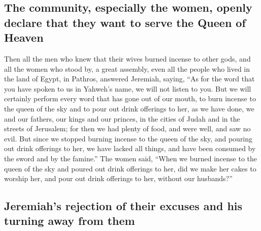 \begin{paracol}{2}
\begin{otherlanguage}{english}
\hypertarget{the-community-especially-the-women-openly-declare-that-they-want-to-serve-the-queen-of-heaven}{%
\subsection{The community, especially the women, openly declare that
they want to serve the Queen of
Heaven}\label{the-community-especially-the-women-openly-declare-that-they-want-to-serve-the-queen-of-heaven}}

 Then all the men who knew that their wives burned
incense to other gods, and all the women who stood by, a great assembly,
even all the people who lived in the land of Egypt, in Pathros, answered
Jeremiah, saying,  ``As for the word that you have spoken
to us in Yahweh's name, we will not listen to you.  But
we will certainly perform every word that has gone out of our mouth, to
burn incense to the queen of the sky and to pour out drink offerings to
her, as we have done, we and our fathers, our kings and our princes, in
the cities of Judah and in the streets of Jerusalem; for then we had
plenty of food, and were well, and saw no evil.  But
since we stopped burning incense to the queen of the sky, and pouring
out drink offerings to her, we have lacked all things, and have been
consumed by the sword and by the famine.''  The women
said, ``When we burned incense to the queen of the sky and poured out
drink offerings to her, did we make her cakes to worship her, and pour
out drink offerings to her, without our husbands?''

\hypertarget{jeremiahs-rejection-of-their-excuses-and-his-turning-away-from-them}{%
\subsection{Jeremiah's rejection of their excuses and his turning away
from
them}\label{jeremiahs-rejection-of-their-excuses-and-his-turning-away-from-them}}


\end{otherlanguage}
\end{paracol}
